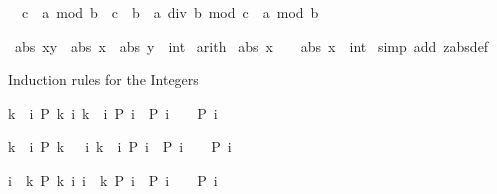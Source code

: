 \begin{isabellebody}
\begin{isamarkuptext}
\begin{isabelle}%
{}\ {\isacharless}\ c\ {\isasymLongrightarrow}\ a\ mod\ {\isacharparenleft}b\ {\isacharasterisk}\ c{\isacharparenright}\ {\isacharequal}\ b\ {\isacharasterisk}\ {\isacharparenleft}a\ div\ b\ mod\ c{\isacharparenright}\ {\isacharplus}\ a\ mod\ b%
\end{isabelle}
%
\end{isamarkuptext}%
\isamarkuptrue%
\ {\isachardoublequote}abs\ {\isacharparenleft}x{\isacharplus}y{\isacharparenright}\ {\isasymle}\ abs\ x\ {\isacharplus}\ abs\ {\isacharparenleft}y\ {\isacharcolon}{\isacharcolon}\ int{\isacharparenright}{\isachardoublequote}\isanewline
\isamarkupfalse%
\ arith\isanewline
\isanewline
\isamarkupfalse%
\ {\isachardoublequote}abs\ {\isacharparenleft}{}{\isacharasterisk}x{\isacharparenright}\ {\isacharequal}\ {}\ {\isacharasterisk}\ abs\ {\isacharparenleft}x\ {\isacharcolon}{\isacharcolon}\ int{\isacharparenright}{\isachardoublequote}\isanewline
\isamarkupfalse%
\ {\isacharparenleft}simp\ add{\isacharcolon}\ zabs{\isacharunderscore}def{\isacharparenright}\isamarkupfalse%
%
\begin{isamarkuptext}%
Induction rules for the Integers

\begin{isabelle}%
{\isasymlbrakk}k\ {\isasymle}\ i{\isacharsemicolon}\ P\ k{\isacharsemicolon}\ {\isasymAnd}i{\isachardot}\ {\isasymlbrakk}k\ {\isasymle}\ i{\isacharsemicolon}\ P\ i{\isasymrbrakk}\ {\isasymLongrightarrow}\ P\ {\isacharparenleft}i\ {\isacharplus}\ {}{\isacharparenright}{\isasymrbrakk}\ {\isasymLongrightarrow}\ P\ i%
\end{isabelle}

\begin{isabelle}%
{\isasymlbrakk}k\ {\isacharless}\ i{\isacharsemicolon}\ P\ {\isacharparenleft}k\ {\isacharplus}\ {}{\isacharparenright}{\isacharsemicolon}\ {\isasymAnd}i{\isachardot}\ {\isasymlbrakk}k\ {\isacharless}\ i{\isacharsemicolon}\ P\ i{\isasymrbrakk}\ {\isasymLongrightarrow}\ P\ {\isacharparenleft}i\ {\isacharplus}\ {}{\isacharparenright}{\isasymrbrakk}\ {\isasymLongrightarrow}\ P\ i%
\end{isabelle}

\begin{isabelle}%
{\isasymlbrakk}i\ {\isasymle}\ k{\isacharsemicolon}\ P\ k{\isacharsemicolon}\ {\isasymAnd}i{\isachardot}\ {\isasymlbrakk}i\ {\isasymle}\ k{\isacharsemicolon}\ P\ i{\isasymrbrakk}\ {\isasymLongrightarrow}\ P\ {\isacharparenleft}i\ {\isacharminus}\ {}{\isacharparenright}{\isasymrbrakk}\ {\isasymLongrightarrow}\ P\ i%
\end{isabelle}


\end{isamarkuptext}
\end{isabellebody}
